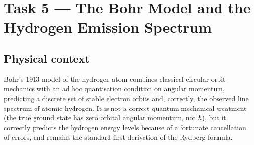 \documentclass[11pt]{article}
\begin{document}
\section{Task 5 --- The Bohr Model and the Hydrogen Emission Spectrum}
\label{sec:task5}

\subsection{Physical context}
Bohr's 1913 model of the hydrogen atom \cite{bohr1913} combines classical circular-orbit mechanics with an ad hoc quantisation condition on angular momentum, predicting a discrete set of stable electron orbits and, correctly, the observed line spectrum of atomic hydrogen. It is not a correct quantum-mechanical treatment (the true ground state has zero orbital angular momentum, not $\hbar$), but it correctly predicts the hydrogen energy levels because of a fortunate cancellation of errors, and remains the standard first derivation of the Rydberg formula.
\end{document}
